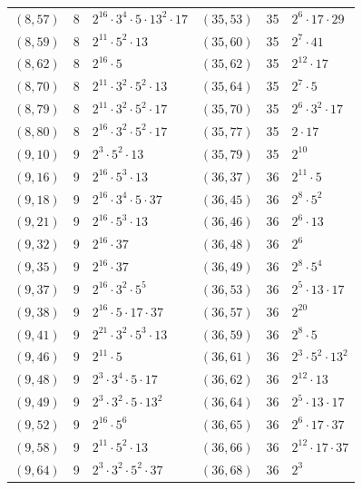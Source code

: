 \documentclass[11pt]{article}
\begin{document}
\begin{longtable}{@{}lrl@{\qquad}lrl@{}}
$(8,57)$ & 8 & $2^{16}\cdot 3^{4}\cdot 5\cdot 13^{2}\cdot 17$ & $(35,53)$ & 35 & $2^{6}\cdot 17\cdot 29$\\
$(8,59)$ & 8 & $2^{11}\cdot 5^{2}\cdot 13$ & $(35,60)$ & 35 & $2^{7}\cdot 41$\\
$(8,62)$ & 8 & $2^{16}\cdot 5$ & $(35,62)$ & 35 & $2^{12}\cdot 17$\\
$(8,70)$ & 8 & $2^{11}\cdot 3^{2}\cdot 5^{2}\cdot 13$ & $(35,64)$ & 35 & $2^{7}\cdot 5$\\
$(8,79)$ & 8 & $2^{11}\cdot 3^{2}\cdot 5^{2}\cdot 17$ & $(35,70)$ & 35 & $2^{6}\cdot 3^{2}\cdot 17$\\
$(8,80)$ & 8 & $2^{16}\cdot 3^{2}\cdot 5^{2}\cdot 17$ & $(35,77)$ & 35 & $2\cdot 17$\\
$(9,10)$ & 9 & $2^{3}\cdot 5^{2}\cdot 13$ & $(35,79)$ & 35 & $2^{10}$\\
$(9,16)$ & 9 & $2^{16}\cdot 5^{3}\cdot 13$ & $(36,37)$ & 36 & $2^{11}\cdot 5$\\
$(9,18)$ & 9 & $2^{16}\cdot 3^{4}\cdot 5\cdot 37$ & $(36,45)$ & 36 & $2^{8}\cdot 5^{2}$\\
$(9,21)$ & 9 & $2^{16}\cdot 5^{3}\cdot 13$ & $(36,46)$ & 36 & $2^{6}\cdot 13$\\
$(9,32)$ & 9 & $2^{16}\cdot 37$ & $(36,48)$ & 36 & $2^{6}$\\
$(9,35)$ & 9 & $2^{16}\cdot 37$ & $(36,49)$ & 36 & $2^{8}\cdot 5^{4}$\\
$(9,37)$ & 9 & $2^{16}\cdot 3^{2}\cdot 5^{5}$ & $(36,53)$ & 36 & $2^{5}\cdot 13\cdot 17$\\
$(9,38)$ & 9 & $2^{16}\cdot 5\cdot 17\cdot 37$ & $(36,57)$ & 36 & $2^{20}$\\
$(9,41)$ & 9 & $2^{21}\cdot 3^{2}\cdot 5^{3}\cdot 13$ & $(36,59)$ & 36 & $2^{8}\cdot 5$\\
$(9,46)$ & 9 & $2^{11}\cdot 5$ & $(36,61)$ & 36 & $2^{3}\cdot 5^{2}\cdot 13^{2}$\\
$(9,48)$ & 9 & $2^{3}\cdot 3^{4}\cdot 5\cdot 17$ & $(36,62)$ & 36 & $2^{12}\cdot 13$\\
$(9,49)$ & 9 & $2^{3}\cdot 3^{2}\cdot 5\cdot 13^{2}$ & $(36,64)$ & 36 & $2^{5}\cdot 13\cdot 17$\\
$(9,52)$ & 9 & $2^{16}\cdot 5^{6}$ & $(36,65)$ & 36 & $2^{6}\cdot 17\cdot 37$\\
$(9,58)$ & 9 & $2^{11}\cdot 5^{2}\cdot 13$ & $(36,66)$ & 36 & $2^{12}\cdot 17\cdot 37$\\
$(9,64)$ & 9 & $2^{3}\cdot 3^{2}\cdot 5^{2}\cdot 37$ & $(36,68)$ & 36 & $2^{3}$\\

\end{longtable}
\end{document}
